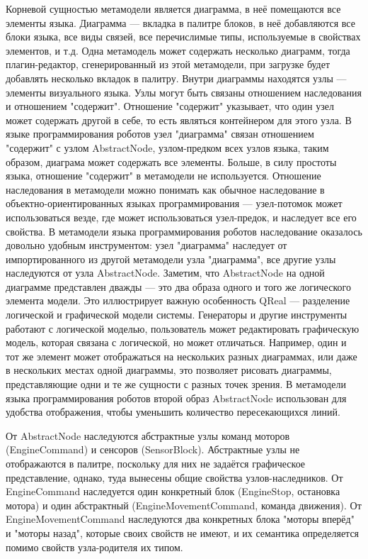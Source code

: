 \documentclass[a4paper]{article}
\begin{document}
Корневой сущностью метамодели является диаграмма, в неё помещаются все элементы языка. Диаграмма --- вкладка в палитре блоков, в неё добавляются все блоки языка, все виды связей, все перечислимые типы, используемые в свойствах элементов, и т.д. Одна метамодель может содержать несколько диаграмм, тогда плагин-редактор, сгенерированный из этой метамодели, при загрузке будет добавлять несколько вкладок в палитру. Внутри диаграммы находятся узлы --- элементы визуального языка. Узлы могут быть связаны отношением наследования и отношением "содержит". Отношение "содержит" указывает, что один узел может содержать другой в себе, то есть являться контейнером для этого узла. В языке программирования роботов узел "диаграмма" связан отношением "содержит" с узлом AbstractNode, узлом-предком всех узлов языка, таким образом, диаграма может содержать все элементы. Больше, в силу простоты языка, отношение "содержит" в метамодели не используется. Отношение наследования в метамодели можно понимать как обычное наследование в объектно-ориентированных языках программирования --- узел-потомок может использоваться везде, где может использоваться узел-предок, и наследует все его свойства. В метамодели языка программирования роботов наследование оказалось довольно удобным инструментом: узел "диаграмма" наследует от импортированного из другой метамодели узла "диаграмма", все другие узлы наследуются от узла AbstractNode. Заметим, что AbstractNode на одной диаграмме представлен дважды --- это два образа одного и того же логического элемента модели. Это иллюстрирует важную особенность QReal --- разделение логической и графической модели системы. Генераторы и другие инструменты работают с логической моделью, пользователь может редактировать графическую модель, которая связана с логической, но может отличаться. Например, один и тот же элемент может отображаться на нескольких разных диаграммах, или даже в нескольких местах одной диаграммы, это позволяет рисовать диаграммы, представляющие одни и те же сущности с разных точек зрения. В метамодели языка программирования роботов второй образ AbstractNode использован для удобства отображения, чтобы уменьшить количество пересекающихся линий.

От AbstractNode наследуются абстрактные узлы команд моторов (EngineCommand) и сенсоров (SensorBlock). Абстрактные узлы не отображаются в палитре, поскольку для них не задаётся графическое представление, однако, туда вынесены общие свойства узлов-наследников. От EngineCommand наследуется один конкретный блок (EngineStop, остановка мотора) и один абстрактный (EngineMovementCommand, команда движения). От EngineMovementCommand наследуются два конкретных блока "моторы вперёд" и "моторы назад", которые своих свойств не имеют, и их семантика определяется помимо свойств узла-родителя их типом. 
\end{document}
